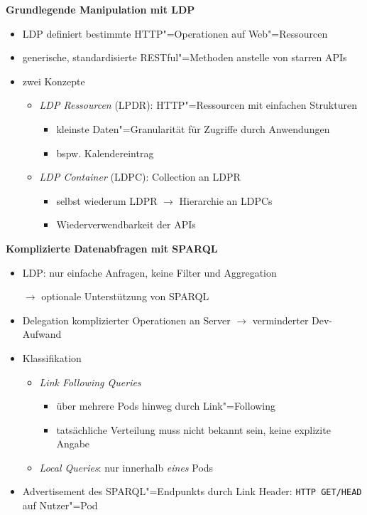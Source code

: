 \textbf{Grundlegende Manipulation mit LDP}
\begin{itemize}
    \item LDP definiert bestimmte HTTP"=Operationen auf Web"=Ressourcen~\cite{sambraSolidPlatformDecentralized2016}
    \item generische, standardisierte RESTful"=Methoden anstelle von starren APIs~\cite{sambraSolidPlatformDecentralized2016}
    \item zwei Konzepte
    \begin{itemize}
        \item \emph{LDP Ressourcen} (LPDR): HTTP"=Ressourcen mit einfachen Strukturen
        \begin{itemize}
            \item kleinste Daten"=Granularität für Zugriffe durch Anwendungen
            \item bspw. Kalendereintrag
        \end{itemize}
        \item \emph{LDP Container} (LDPC): Collection an LDPR
        \begin{itemize}
            \item selbst wiederum LDPR $\to$ Hierarchie an LDPCs
            \item Wiederverwendbarkeit der APIs~\cite{sambraSolidPlatformDecentralized2016}
        \end{itemize}
    \end{itemize}
\end{itemize}

\vspace{1cm}

\textbf{Komplizierte Datenabfragen mit SPARQL}~\cite{sambraSolidPlatformDecentralized2016}
\begin{itemize}
    \item LDP: nur einfache Anfragen, keine Filter und Aggregation
    \item[$\to$] optionale Unterstützung von SPARQL
    \item Delegation komplizierter Operationen an Server $\to$ verminderter Dev-Aufwand~
    \item Klassifikation
    \begin{itemize}
        \item \emph{Link Following Queries}
        \begin{itemize}
            \item über mehrere Pods hinweg durch Link"=Following
            \item tatsächliche Verteilung muss nicht bekannt sein, keine explizite Angabe
        \end{itemize}
        \item \emph{Local Queries}: nur innerhalb \emph{eines} Pods
    \end{itemize}
    \item Advertisement des SPARQL"=Endpunkts durch Link Header: \texttt{HTTP GET/HEAD} auf Nutzer"=Pod
\end{itemize}



